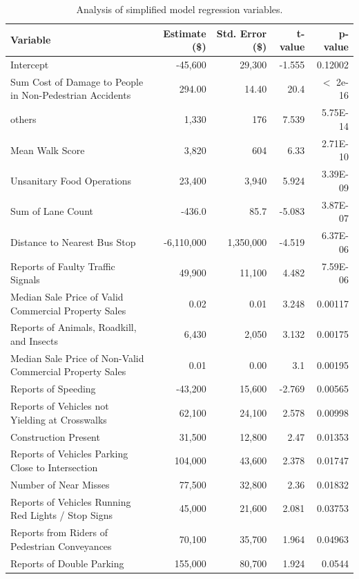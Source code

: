 \documentclass{llncs}
\begin{document}
\begin{table}[!h]
\begin{center}
\caption{Analysis of simplified model regression variables.}
\label{table:RegressionAnalysis}
\begin{tabular}{lrrrr}
\hline
\rule{0pt}{12pt}
Variable
& Estimate (\$)
& Std. Error (\$)
& t-value
& p-value\\[2pt]
\hline
Intercept&-45,600&29,300&-1.555&0.12002\\
Sum Cost of Damage to People in
 Non-Pedestrian Accidents&294.00&14.40&20.4&$<$ 2e-16\\
others&1,330&176&7.539&5.75E-14\\
Mean Walk Score&3,820&604&6.33&2.71E-10\\
Unsanitary Food Operations&23,400&3,940&5.924&3.39E-09\\
Sum of Lane Count&-436.0&85.7&-5.083&3.87E-07\\
Distance to Nearest Bus Stop&-6,110,000&1,350,000&-4.519&6.37E-06\\
Reports of Faulty Traffic Signals&49,900&11,100&4.482&7.59E-06\\
Median Sale Price of Valid 
Commercial Property Sales&0.02&0.01&3.248&0.00117\\
Reports of Animals, Roadkill, and Insects&6,430&2,050&3.132&0.00175\\
Median Sale Price of Non-Valid 
Commercial Property Sales&0.01&0.00&3.1&0.00195\\
Reports of Speeding&-43,200&15,600&-2.769&0.00565\\
Reports of Vehicles not 
Yielding at Crosswalks&62,100&24,100&2.578&0.00998\\
Construction Present&31,500&12,800&2.47&0.01353\\
Reports of Vehicles Parking 
Close to Intersection&104,000&43,600&2.378&0.01747\\
Number of Near Misses&77,500&32,800&2.36&0.01832\\
Reports of Vehicles Running 
Red Lights / Stop Signs&45,000&21,600&2.081&0.03753\\
Reports from Riders of Pedestrian Conveyances&70,100&35,700&1.964&0.04963\\
Reports of Double Parking&155,000&80,700&1.924&0.0544\\
[2pt]
\hline
\end{tabular}
\end{center}
\end{table}
\FloatBarrier
\end{document}
